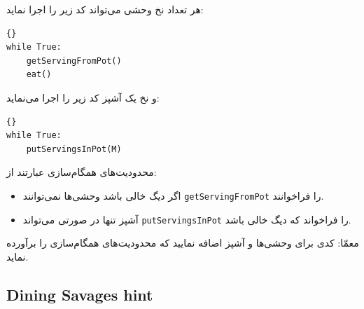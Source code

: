 \documentclass{book}
\newcommand{\clearemptydoublepage}{\newpage\cleardoublepage}
\begin{document}
    هر تعداد نخ وحشی می‌تواند کد زیر را اجرا نماید:

\begin{latin}
\begin{latin}
\begin{lstlisting}[title=\rl{کد ناهمگام یک وحشی}]{}
while True:
    getServingFromPot()
    eat()
\end{lstlisting}
\end{latin}
\end{latin}

    و نخ یک آشپز کد زیر را اجرا می‌نماید:

\begin{latin}
\begin{latin}
\begin{lstlisting}[title=\rl{کد ناهمگام آشپز}]{}
while True:
    putServingsInPot(M)
\end{lstlisting}
\end{latin}
\end{latin}

    محدودیت‌های همگام‌سازی عبارتند از:

\begin{itemize}

\item 
    اگر دیگ خالی باشد وحشی‌ها نمی‌توانند {\tt getServingFromPot}  را فراخوانند. 

\item 
    آشپز تنها در صورتی می‌تواند  {\tt putServingsInPot} را فراخواند که دیگ خالی باشد. 

\end{itemize}

    معمّا: کدی برای وحشی‌ها و آشپز اضافه نمایید که محدودیت‌های همگام‌سازی را برآورده نماید. 

\clearemptydoublepage
\subsection{Dining Savages hint}
\end{document}
